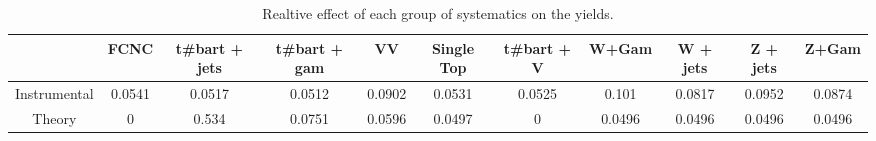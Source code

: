 \begin{table}[htbp]
\begin{center}
\begin{tabular}{|c|c|c|c|c|c|c|c|c|c|c|}
\hline 
      & FCNC      & t#bar{t} + jets      & t#bar{t} +  gam      & VV      & Single Top      & t#bar{t} + V      & W+Gam      & W + jets      & Z + jets      & Z+Gam \\ 
\hline 
 Instrumental & 0.0541 & 0.0517 & 0.0512 & 0.0902 & 0.0531 & 0.0525 & 0.101 & 0.0817 & 0.0952 & 0.0874 \\ 
 Theory & 0 & 0.534 & 0.0751 & 0.0596 & 0.0497 & 0 & 0.0496 & 0.0496 & 0.0496 & 0.0496 \\ 
\hline 
\end{tabular} 
\caption{Realtive effect of each group of systematics on the yields.} 
\end{center} 
\end{table} 
